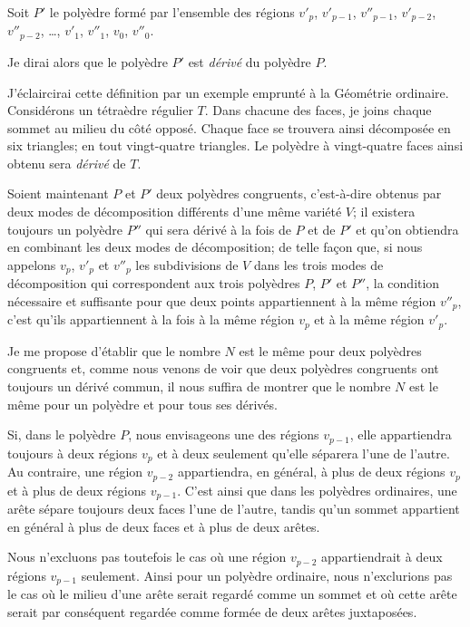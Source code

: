 \documentclass{article}
\begin{document}
Soit $P'$ le polyèdre formé par l'ensemble des régions $v'_{p}$, $v'_{p-1}$, $v''_{p-1}$, $v'_{p-2}$, $v''_{p-2}$, \ldots, $v'_{1}$, $v''_{1}$, $v_{0}$, $v''_{0}$.

Je dirai alors que le polyèdre $P'$ est \emph{dérivé} du polyèdre $P$.

J'éclaircirai cette définition par un exemple emprunté à la Géométrie ordinaire. Considérons un tétraèdre régulier $T$. Dans chacune des faces, je joins chaque sommet au milieu du côté opposé. Chaque face se trouvera ainsi décomposée en six triangles; en tout vingt-quatre triangles. Le polyèdre à vingt-quatre faces ainsi obtenu sera \emph{dérivé} de $T$.

Soient maintenant $P$ et $P'$ deux polyèdres congruents, c'est-à-dire obtenus par deux modes de décomposition différents d'une même variété $V$; il existera toujours un polyèdre $P''$ qui sera dérivé à la fois de $P$ et de $P'$ et qu'on obtiendra en combinant les deux modes de décomposition; de telle façon que, si nous appelons $v_{p}$, $v'_{p}$ et $v''_{p}$ les subdivisions de $V$ dans les trois modes de décomposition qui correspondent aux trois polyèdres $P$, $P'$ et $P''$, la condition nécessaire et suffisante pour que deux points appartiennent à la même région $v''_{p}$, c'est qu'ils appartiennent à la fois à la même région $v_{p}$ et à la même région $v'_{p}$.

Je me propose d'établir que le nombre $N$ est le même pour deux polyèdres congruents et, comme nous venons de voir que deux polyèdres congruents ont toujours un dérivé commun, il nous suffira de montrer que le nombre $N$ est le même pour un polyèdre et pour tous ses dérivés.

Si, dans le polyèdre $P$, nous envisageons une des régions $v_{p-1}$, elle appartiendra toujours à deux régions $v_{p}$ et à deux seulement qu'elle séparera l'une de l'autre. Au contraire, une région $v_{p-2}$ appartiendra, en général, à plus de deux régions $v_{p}$ et à plus de deux régions $v_{p-1}$. C'est ainsi que dans les polyèdres ordinaires, une arête sépare toujours deux faces l'une de l'autre, tandis qu'un sommet appartient en général à plus de deux faces et à plus de deux arêtes.

Nous n'excluons pas toutefois le cas où une région $v_{p-2}$ appartiendrait à deux régions $v_{p-1}$ seulement. Ainsi pour un polyèdre ordinaire, nous n'exclurions pas le cas où le milieu d'une arête serait regardé comme un sommet et où cette arête serait par conséquent regardée comme formée de deux arêtes juxtaposées.
\end{document}
